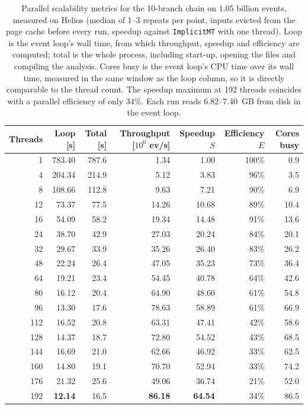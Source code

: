 \begin{table}[htbp]
\centering
\caption{Parallel scalability metrics for the 10-branch chain on $1.05$ billion events, measured on Helios (median of 1--3 repeats per point, inputs evicted from the page cache before every run, speedup against \texttt{ImplicitMT} with one thread). Loop is the event loop's wall time, from which throughput, speedup and efficiency are computed; total is the whole process, including start-up, opening the files and compiling the analysis. Cores busy is the event loop's CPU time over its wall time, measured in the same window as the loop column, so it is directly comparable to the thread count. The speedup maximum at 192 threads coincides with a parallel efficiency of only $34\%$. Each run reads 6.82--7.40~GB from disk in the event loop.}
\label{tab:scalability-chain11}
\setlength{\tabcolsep}{5pt}
\begin{tabular}{rrrrrrr}
\toprule
Threads & Loop [s] & Total [s] & Throughput [$10^6$ ev/s] & Speedup $S$ & Efficiency $E$ & Cores busy \\
\midrule
 1 & 783.40 & 787.6 & 1.34 & 1.00 & 100\% & 0.9 \\
 4 & 204.34 & 214.9 & 5.12 & 3.83 & 96\% & 3.5 \\
 8 & 108.66 & 112.8 & 9.63 & 7.21 & 90\% & 6.9 \\
12 & 73.37 & 77.5 & 14.26 & 10.68 & 89\% & 10.4 \\
16 & 54.09 & 58.2 & 19.34 & 14.48 & 91\% & 13.6 \\
24 & 38.70 & 42.9 & 27.03 & 20.24 & 84\% & 20.1 \\
32 & 29.67 & 33.9 & 35.26 & 26.40 & 83\% & 26.2 \\
48 & 22.24 & 26.4 & 47.05 & 35.23 & 73\% & 36.4 \\
64 & 19.21 & 23.4 & 54.45 & 40.78 & 64\% & 42.6 \\
80 & 16.12 & 20.4 & 64.90 & 48.60 & 61\% & 54.8 \\
96 & 13.30 & 17.6 & 78.63 & 58.89 & 61\% & 66.9 \\
112 & 16.52 & 20.8 & 63.31 & 47.41 & 42\% & 58.6 \\
128 & 14.37 & 18.7 & 72.80 & 54.52 & 43\% & 68.5 \\
144 & 16.69 & 21.0 & 62.66 & 46.92 & 33\% & 62.5 \\
160 & 14.80 & 19.1 & 70.70 & 52.94 & 33\% & 74.2 \\
176 & 21.32 & 25.6 & 49.06 & 36.74 & 21\% & 52.0 \\
192 & \textbf{12.14} & 16.5 & \textbf{86.18} & \textbf{64.54} & 34\% & 86.5 \\
\bottomrule
\end{tabular}
\end{table}
